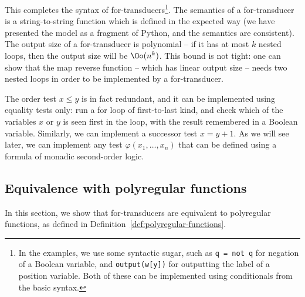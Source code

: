 This completes the syntax of for-transducers\footnote{
  In the examples, we use some syntactic sugar, such as \texttt{q = not q} for negation of a Boolean variable, and \texttt{output(w[y])} for outputting the label of a position variable. Both of these can be implemented using conditionals from the basic syntax.
}.  The semantics of a for-transducer is a string-to-string function which is defined in the expected way (we have presented the model as a fragment of Python, and the semantics are consistent).
The output size of a for-transducer is polynomial -- if it has at most $k$ nested loops, then the output size will be $\Oo(n^k)$. This bound is not tight: one can show that the map reverse function -- which has linear output size -- needs two nested loops in order to be implemented by a for-transducer. 

\begin{myexample}
  The order test  $x \le y$ is in fact redundant, and it  can be implemented using equality tests only: run  a for loop of first-to-last kind, and check which of the variables $x$ or $y$ is seen  first in the loop, with the result remembered  in a Boolean variable. Similarly, we can implement a successor test $x = y+1$. As we will see later, we can implement any test $\varphi(x_1,\ldots,x_n)$ that can be defined using a formula of monadic second-order logic.
\end{myexample}

\subsection{Equivalence with polyregular functions}
\label{sec:for-transducers-equivalence}
In this section, we show that for-transducers are equivalent to polyregular functions, as defined in Definition~\ref{def:polyregular-functions}. 

